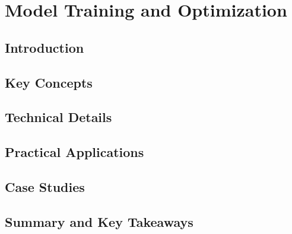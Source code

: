 ﻿%

\chapter{Model Training and Optimization}
\label{ch:chapter-10}

\section{Introduction}


\section{Key Concepts}


\section{Technical Details}


\section{Practical Applications}


\section{Case Studies}


\section{Summary and Key Takeaways}



